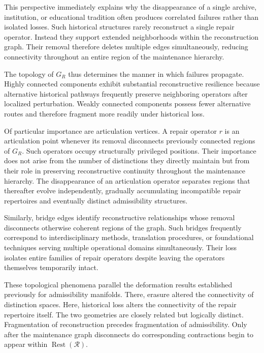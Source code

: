 \documentclass[12pt,oneside]{article}
\theoremstyle{plain}
\theoremstyle{definition}
\theoremstyle{remark}
\theoremstyle{plain}
\DeclareMathOperator{\Rest}{Rest}
\begin{document}
This perspective immediately explains why the disappearance of a single archive, institution, or
educational tradition often produces correlated failures rather than isolated losses. Such
historical structures rarely reconstruct a single repair operator. Instead they support extended
neighborhoods within the reconstruction graph. Their removal therefore deletes multiple edges
simultaneously, reducing connectivity throughout an entire region of the maintenance hierarchy.

The topology of $G_R$ thus determines the manner in which failures propagate. Highly connected
components exhibit substantial reconstructive resilience because alternative historical pathways
frequently preserve neighboring operators after localized perturbation. Weakly connected components
possess fewer alternative routes and therefore fragment more readily under historical loss.

Of particular importance are articulation vertices. A repair operator $r$ is an articulation point
whenever its removal disconnects previously connected regions of $G_R$. Such operators occupy
structurally privileged positions. Their importance does not arise from the number of distinctions
they directly maintain but from their role in preserving reconstructive continuity throughout the
maintenance hierarchy. The disappearance of an articulation operator separates regions that
thereafter evolve independently, gradually accumulating incompatible repair repertoires and
eventually distinct admissibility structures.

Similarly, bridge edges identify reconstructive relationships whose removal disconnects otherwise
coherent regions of the graph. Such bridges frequently correspond to interdisciplinary methods,
translation procedures, or foundational techniques serving multiple operational domains
simultaneously. Their loss isolates entire families of repair operators despite leaving the
operators themselves temporarily intact.

These topological phenomena parallel the deformation results established previously for
admissibility manifolds. There, erasure altered the connectivity of distinction spaces. Here,
historical loss alters the connectivity of the repair repertoire itself. The two geometries are
closely related but logically distinct. Fragmentation of reconstruction precedes fragmentation of
admissibility. Only after the maintenance graph disconnects do corresponding contractions begin to
appear within $\Rest(\mathcal{R})$.
\end{document}
